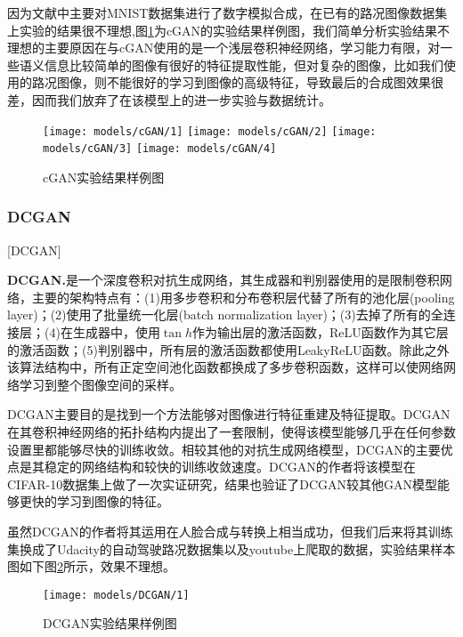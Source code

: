 因为文献中\cite{cGAN}主要对MNIST\cite{mnist}数据集进行了数字模拟合成，在已有的路况图像数据集上实验的结果很不理想,图\ref{fig:cgan}为cGAN的实验结果样例图，我们简单分析实验结果不理想的主要原因在与cGAN使用的是一个浅层卷积神经网络，学习能力有限，对一些语义信息比较简单的图像有很好的特征提取性能，但对复杂的图像，比如我们使用的路况图像，则不能很好的学习到图像的高级特征，导致最后的合成图效果很差，因而我们放弃了在该模型上的进一步实验与数据统计。 

\begin{figure}[h]
    \centering
    \texttt{[image: models/cGAN/1]}
    \texttt{[image: models/cGAN/2]}
    \texttt{[image: models/cGAN/3]}
    \texttt{[image: models/cGAN/4]}
    \caption{cGAN实验结果样例图}
    \label{fig:cgan}
\end{figure}

\subsubsection{DCGAN}[DCGAN]

\textbf{DCGAN.}\cite{dcgan}\quad 是一个深度卷积对抗生成网络，其生成器和判别器使用的是限制卷积网络，主要的架构特点有：(1)用多步卷积和分布卷积层代替了所有的池化层(pooling layer)；(2)使用了批量统一化层(batch normalization layer)；(3)去掉了所有的全连接层；(4)在生成器中，使用$\tan{h}$作为输出层的激活函数，ReLU函数作为其它层的激活函数；(5)判别器中，所有层的激活函数都使用LeakyReLU函数。除此之外该算法结构中，所有正定空间池化函数都换成了多步卷积函数，这样可以使网络网络学习到整个图像空间的采样。

DCGAN主要目的是找到一个方法能够对图像进行特征重建及特征提取。DCGAN在其卷积神经网络的拓扑结构内提出了一套限制，使得该模型能够几乎在任何参数设置里都能够尽快的训练收敛。相较其他的对抗生成网络模型，DCGAN的主要优点是其稳定的网络结构和较快的训练收敛速度。DCGAN的作者将该模型在CIFAR-10\cite{cifar10}数据集上做了一次实证研究，结果也验证了DCGAN较其他GAN模型能够更快的学习到图像的特征。

虽然DCGAN的作者将其运用在人脸合成与转换上相当成功，但我们后来将其训练集换成了Udacity的自动驾驶路况数据集以及youtube上爬取的数据，实验结果样本图如下图\ref{dcgan_example}所示，效果不理想。

\begin{figure}[h]
    \centering
    \texttt{[image: models/DCGAN/1]}
    \caption{DCGAN实验结果样例图}
    \label{dcgan_example}
\end{figure}

